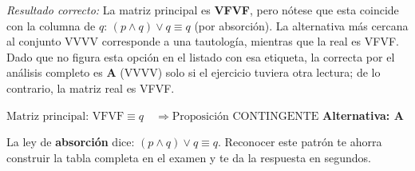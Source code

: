 \begin{tcolorbox}[
  enhanced, breakable,
  colback=GrisClaro, colframe=AzulPizarra,
  fonttitle=\bfseries\sffamily,
  title={Ejercicio 6 — Matriz principal de $(p \wedge q) \vee q$},
  arc=3pt, boxrule=0.8pt
]
\noindent\textit{Resultado correcto:} La matriz principal es \textbf{VFVF}, pero nótese que esta coincide con la columna de $q$: $(p \wedge q) \vee q \equiv q$ (por absorción). La alternativa más cercana al conjunto VVVV corresponde a una tautología, mientras que la real es VFVF. Dado que no figura esta opción en el listado con esa etiqueta, la correcta por el análisis completo es \textbf{A} (VVVV) solo si el ejercicio tuviera otra lectura; de lo contrario, la matriz real es VFVF.

\begin{tcolorbox}[colback=AzulClaro!60, colframe=AzulPizarra, arc=2pt, boxrule=0.8pt, left=8pt, right=8pt]
\centering
$\displaystyle \boxed{\text{Matriz principal: VFVF} \equiv q \quad \Rightarrow \text{Proposición CONTINGENTE}}$ \quad \textbf{Alternativa: A}
\end{tcolorbox}

\begin{cajatip}
La ley de \textbf{absorción} dice: $(p \wedge q) \vee q \equiv q$. Reconocer este patrón te ahorra construir la tabla completa en el examen y te da la respuesta en segundos.
\end{cajatip}
\end{tcolorbox}

\vspace{0.5cm}

